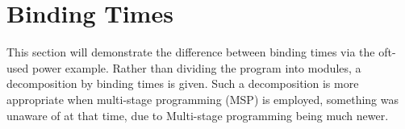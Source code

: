 \documentclass[12pt, titlepage]{article}
\newcounter{mnum}
\newcommand{\mthemnum}{M\themnum}
\begin{document}
%
%
%
%
%
%
%
%

\section{Binding Times}

This section will demonstrate the difference between binding times via the 
oft-used power example. Rather than dividing the program into modules, a 
decomposition by binding times is given. Such a decomposition is more 
appropriate when multi-stage programming (MSP) is employed, something 
\cite{Parnas1972a} was unaware of at that time, due to Multi-stage programming 
being much newer. 
\end{document}
